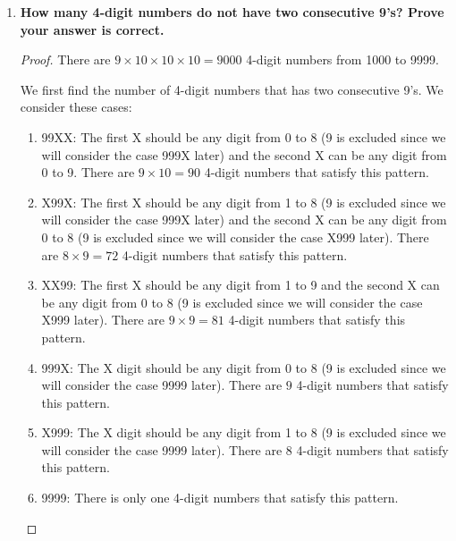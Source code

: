 \documentclass[10pt]{article}
\begin{document}
\begin{enumerate}
\begin{enumerate}
    \item Thousands position: From 1 to 10000, the numbers that have digit 3 at the thousands positions are from 3000 to 3999. So there are $\frac{3999 - 3000}{1} + 1 = 1000$ numbers that have digit 3 at the thousands position. Therefore, there are 1000 digit 3's at this position.
\end{enumerate}

In conclusion, there are $1000 + 1000 + 1000 + 1000 = 4000$ digit 3's when we wrote numbers from 1 to 10000. 
\vskip 1cm

\item
\textbf{How many 4-digit numbers do not have two consecutive 9's?  Prove your answer is correct.}
\vskip 1cm
\begin{proof}
    There are $9 \times 10 \times 10 \times 10 = 9000$ 4-digit numbers from 1000 to 9999.

    We first find the number of 4-digit numbers that has two consecutive 9's. We consider these cases:

\begin{enumerate}
    \item 99XX: The first X should be any digit from 0 to 8 (9 is excluded since we will consider the case 999X later) and the second X can be any digit from 0 to 9. There are $9 \times 10 = 90$ 4-digit numbers that satisfy this pattern.
    \item X99X: The first X should be any digit from 1 to 8 (9 is excluded since we will consider the case 999X later) and the second X can be any digit from 0 to 8 (9 is excluded since we will consider the case X999 later). There are $8 \times 9 = 72$ 4-digit numbers that satisfy this pattern.
    \item XX99: The first X should be any digit from 1 to 9 and the second X can be any digit from 0 to 8 (9 is excluded since we will consider the case X999 later). There are $9 \times 9 = 81$ 4-digit numbers that satisfy this pattern.
    \item 999X: The X digit should be any digit from 0 to 8 (9 is excluded since we will consider the case 9999 later). There are $9$ 4-digit numbers that satisfy this pattern.
    \item X999: The X digit should be any digit from 1 to 8 (9 is excluded since we will consider the case 9999 later). There are $8$ 4-digit numbers that satisfy this pattern.
    \item 9999: There is only one 4-digit numbers that satisfy this pattern.
\end{enumerate}


\end{proof}
\end{enumerate}
\end{document}
